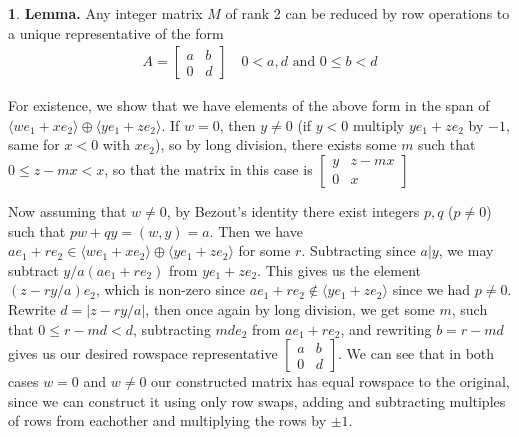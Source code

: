 \documentclass[10.5pt]{article}
\theoremstyle{definition}
\newtheorem{pb}{}
\newcommand{\abs}[1]{\lvert#1\rvert}
\newcommand{\gen}[1]{\langle #1 \rangle}
\newcommand{\tand}{\text{ and }}
\begin{document}
    \begin{pb}
        \textbf{Lemma.} Any integer matrix \(M\) of rank 2 can be reduced by row operations to a unique representative of the form
        \begin{align*}
            A = \begin{bmatrix} a & b \\ 0 & d \end{bmatrix} \quad 0 < a, d \tand 0 \leq b < d
        \end{align*}

        For existence, we show that we have elements of the above form in the span of \(\gen{we_1 + xe_2} \oplus \gen{ye_1 + ze_2}\). If \(w = 0\), then \(y \neq 0\) (if \(y < 0\) multiply \(ye_1 + ze_2\) by \(-1\), same for \(x < 0\) with \(xe_2\)), so by long division, there exists some \(m\) such that \(0 \leq z - mx < x\), so that the matrix in this case is
        \(\begin{bmatrix} y & z - mx \\ 0 & x \end{bmatrix}\)
        
        Now assuming that \(w \neq 0\), by Bezout's identity there exist integers \(p,q\) (\(p \neq 0\)) such that \(pw + qy = (w,y) = a\). Then we have \(ae_1 + re_2 \in \gen{we_1 + xe_2} \oplus \gen{ye_1 + ze_2}\) for some \(r\). Subtracting since \(a \vert y\), we may subtract \(y/a(ae_1 + re_2)\) from \(ye_1 + ze_2\). This gives us the element \((z - ry/a)e_2\), which is non-zero since \(ae_1 + re_2 \not \in \gen{ye_1 + ze_2}\) since we had \(p \neq 0\). Rewrite \(d = \abs{z - ry/a}\), then once again by long division, we get some \(m\), such that \(0 \leq r - md < d\), subtracting \(md e_2\) from \(ae_1 + re_2\), and rewriting \(b = r-md\) gives us our desired rowspace representative \(\begin{bmatrix} a & b \\ 0 & d \end{bmatrix}\). We can see that in both cases \(w = 0\) and \(w \neq 0\) our constructed matrix has equal rowspace to the original, since we can construct it using only row swaps, adding and subtracting multiples of rows from eachother and multiplying the rows by \(\pm 1\).


\end{pb}
\end{document}
